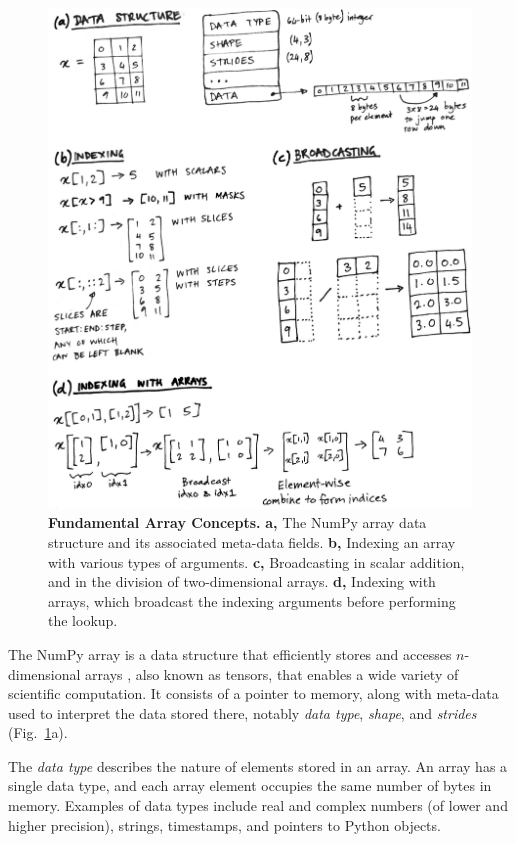 \begin{figure}
  \centering
  \includegraphics[width=\textwidth]{static/sketches/array-concepts}
  \caption{\textbf{Fundamental Array Concepts.}
    \textbf{a,} The NumPy array data structure and its associated meta-data fields.
    \textbf{b,} Indexing an array with various types of arguments.
    \textbf{c,} Broadcasting in scalar addition, and in the division of two-dimensional arrays.
    \textbf{d,} Indexing with arrays, which broadcast the indexing arguments before performing the lookup.
   }
  \label{fig:array-concepts}
\end{figure}

The NumPy array is a data structure that efficiently stores and accesses
$n$-dimensional arrays \cite{vanderwalt2011numpy}, also known as tensors, that
enables a wide variety of scientific computation.
It consists of a pointer to memory, along with meta-data used to interpret the
data stored there, notably {\em data type}, {\em shape}, and {\em strides}
(Fig.~\ref{fig:array-concepts}a).

The {\em data type} describes the nature of elements stored in an array.
An array has a single data type, and each array element occupies the same
number of bytes in memory.
Examples of data types include real and complex numbers (of lower and higher
precision), strings, timestamps, and pointers to Python objects.

